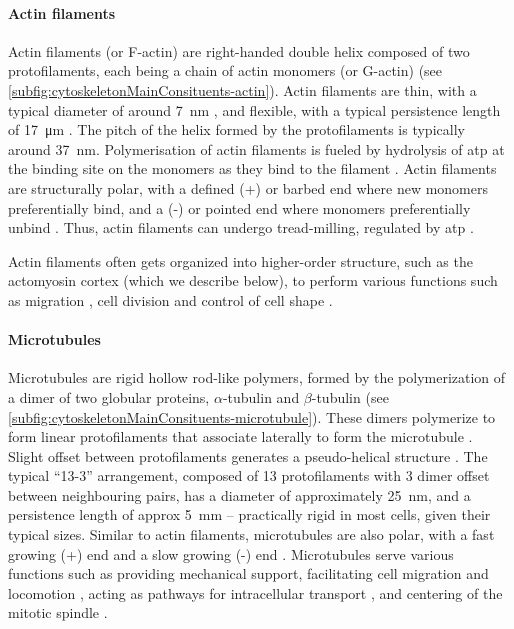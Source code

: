 \paragraph{Actin filaments}
Actin filaments (or F-actin) are right-handed double helix composed of two protofilaments, each being a chain of actin monomers (or G-actin) \citep{pollard1986actin,pollard2000molecular} (see \autoref{subfig:cytoskeletonMainConsituents-actin}). Actin filaments are thin, with a typical diameter of around \SI{7}{\nano\meter} \citep{cooper2007cell}, and flexible, with a typical persistence length of \SI{17}{\micro\meter} \citep{ott1993measurement,gittes1993flexural}. The pitch of the helix formed by the protofilaments is typically around \SI{37}{\nano\meter}. Polymerisation of actin filaments is fueled by hydrolysis of \ac{atp} at the binding site on the monomers as they bind to the filament \citep{fujiwara2007polymerization}. Actin filaments are structurally polar, with a defined (+) or barbed end where new monomers preferentially bind, and a (-) or pointed end where monomers preferentially unbind \citep{pollard1986actin,pollard2000molecular,vavylonis2005actin}. Thus, actin filaments can undergo tread-milling, regulated by \ac{atp} \citep{wegner1982treadmilling}.

Actin filaments often gets organized into higher-order structure, such as the actomyosin cortex (which we describe below), to perform various functions such as migration \citep{pollard2003cellular}, cell division \citep{sanger1975changing} and control of cell shape \citep{clarke1977nonmuscle}. 

\paragraph{Microtubules}
Microtubules are rigid hollow rod-like polymers, formed by the polymerization of a dimer of two globular proteins, $\alpha$-tubulin and $\beta$-tubulin \citep{chaffey2003alberts,nogales1998structure} (see \autoref{subfig:cytoskeletonMainConsituents-microtubule}). These dimers polymerize to form linear protofilaments that associate laterally to form the microtubule \citep{chaffey2003alberts}. Slight offset between protofilaments generates a pseudo-helical structure \citep{hunyadi2007microtubule}. The typical \enquote{\num{13}-\num{3}} arrangement, composed of \num{13} protofilaments with \num{3} dimer offset between neighbouring pairs, has a diameter of approximately \SI{25}{\nano\meter}, and a persistence length of approx \SI{5}{\milli\meter} \citep{chalfie1979organization,chaffey2003alberts,gittes1993flexural,ledbetter1963microtubule} -- practically rigid in most cells, given their typical sizes. Similar to actin filaments, microtubules are also polar, with a fast growing (+) end and a slow growing (-) end \citep{howard2003dynamics}. Microtubules serve various functions such as providing mechanical support, facilitating cell migration and locomotion \citep{mikhailov1998relationship}, acting as pathways for intracellular transport \citep{chaffey2003alberts}, and centering of the mitotic spindle \citep{pearson2004dynamic,grill2003distribution,grill2005theory}.

